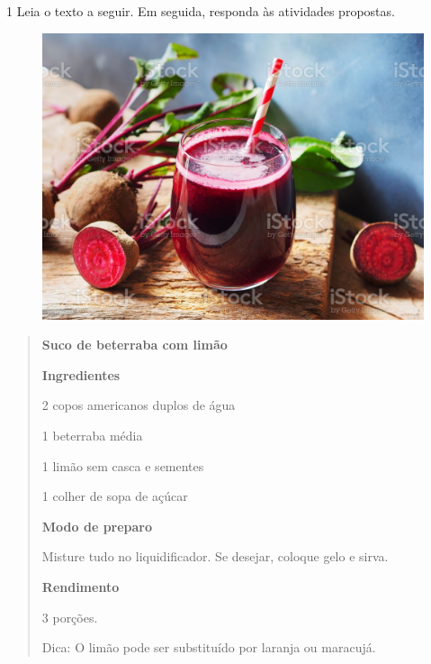 
\num{1} Leia o texto a seguir. Em seguida, responda às atividades propostas.


\begin{figure}[htpb!]
\centering
\includegraphics[width=.7\textwidth]{media/image10.jpeg}
\end{figure}

\begin{quote}
\textbf{Suco de beterraba com limão}

\textbf{Ingredientes}

2 copos americanos duplos de água

1 beterraba média

1 limão sem casca e sementes

1 colher de sopa de açúcar

\textbf{Modo de preparo}

Misture tudo no liquidificador. Se desejar, coloque gelo e sirva.

\textbf{Rendimento}

3 porções.

Dica: O limão pode ser substituído por laranja ou maracujá.

\end{quote}

